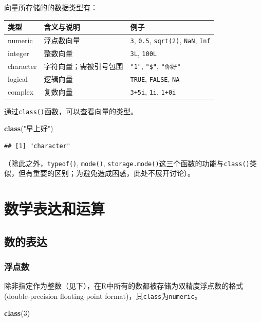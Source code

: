 \documentclass[]{book}
\newenvironment{Shaded}{\begin{snugshade}}{\end{snugshade}}
\newcommand{\DecValTok}[1]{\textcolor[rgb]{0.00,0.00,0.81}{#1}}
\newcommand{\KeywordTok}[1]{\textcolor[rgb]{0.13,0.29,0.53}{\textbf{#1}}}
\newcommand{\NormalTok}[1]{#1}
\newcommand{\StringTok}[1]{\textcolor[rgb]{0.31,0.60,0.02}{#1}}
\begin{document}
向量所存储的的数据类型有：

\begin{longtable}[]{@{}lll@{}}
\toprule
类型 & 含义与说明 & 例子\tabularnewline
\midrule
\endhead
numeric & 浮点数向量 & \texttt{3}, \texttt{0.5}, \texttt{sqrt(2)}, \texttt{NaN}, \texttt{Inf}\tabularnewline
integer & 整数向量 & \texttt{3L}, \texttt{100L}\tabularnewline
character & 字符向量；需被引号包围 & \texttt{"1"}, \texttt{"\$"}, \texttt{"你好"}\tabularnewline
logical & 逻辑向量 & \texttt{TRUE}, \texttt{FALSE}, \texttt{NA}\tabularnewline
complex & 复数向量 & \texttt{3+5i}, \texttt{1i}, \texttt{1+0i}\tabularnewline
\bottomrule
\end{longtable}

通过\texttt{class()}函数，可以查看向量的类型。

\begin{Shaded}
\begin{Highlighting}[]
\KeywordTok{class}\NormalTok{(}\StringTok{"早上好"}\NormalTok{)}
\end{Highlighting}
\end{Shaded}

\begin{verbatim}
## [1] "character"
\end{verbatim}

（除此之外，\texttt{typeof()}, \texttt{mode()}, \texttt{storage.mode()}这三个函数的功能与\texttt{class()}类似，但有重要的区别；为避免造成困惑，此处不展开讨论）。

\section{数学表达和运算}

\subsection{数的表达}

\subsubsection{浮点数}

除非指定作为整数（见下），在R中所有的数都被存储为双精度浮点数的格式 (double-precision floating-point format)，其\texttt{class}为\texttt{numeric}。

\begin{Shaded}
\begin{Highlighting}[]
\KeywordTok{class}\NormalTok{(}\DecValTok{3}\NormalTok{)}
\end{Highlighting}
\end{Shaded}
\end{document}

